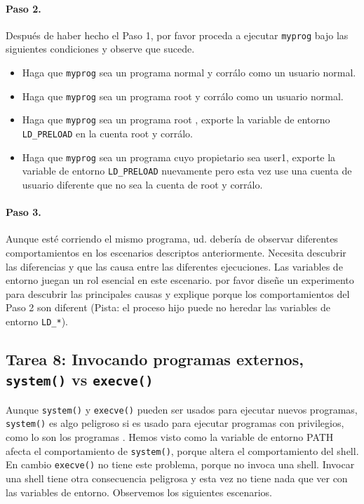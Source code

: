 \paragraph{Paso 2.}
Después de haber hecho el Paso 1, por favor proceda a ejecutar  {\tt myprog} bajo las siguientes condiciones y observe que sucede.

  \begin{itemize}
   \item Haga que {\tt myprog} sea un programa normal y corrálo como un usuario normal.
   \item Haga que {\tt myprog} sea un programa root \setuid y corrálo como un usuario normal.
   \item Haga que {\tt myprog} sea un programa root \setuid, exporte la variable de entorno {\tt LD\_PRELOAD} en la cuenta root y corrálo.
  \item Haga que {\tt myprog} sea un programa \setuid cuyo propietario sea user1,
  exporte la variable de entorno {\tt LD\_PRELOAD}  nuevamente pero esta vez use una cuenta de usuario diferente que no sea la cuenta de root y corrálo.
  \end{itemize}


\paragraph{Paso 3.}
Aunque esté corriendo el mismo programa, ud. debería de observar diferentes comportamientos en los escenarios descriptos anteriormente. Necesita descubrir las diferencias y que las causa entre las diferentes ejecuciones. Las variables de entorno juegan un rol esencial en este escenario. por favor diseñe un experimento para descubrir las principales causas y explique porque los comportamientos del Paso 2 son diferent (Pista: el proceso hijo puede no heredar las variables de entorno {\tt LD\_*}).



\subsection{Tarea 8: Invocando programas externos, {\tt system()} vs {\tt execve()}}

Aunque {\tt system()} y {\tt execve()} pueden ser usados para ejecutar nuevos programas, {\tt system()} es algo peligroso si es usado para ejecutar programas con privilegios, como lo son los programas \setuid. Hemos visto como la variable de entorno PATH afecta el comportamiento de {\tt system()}, porque altera el comportamiento del shell. En cambio {\tt execve()} no tiene este problema, porque no invoca una shell. Invocar una shell tiene otra consecuencia peligrosa y esta vez no tiene nada que ver con las variables de entorno. Observemos los siguientes escenarios.

